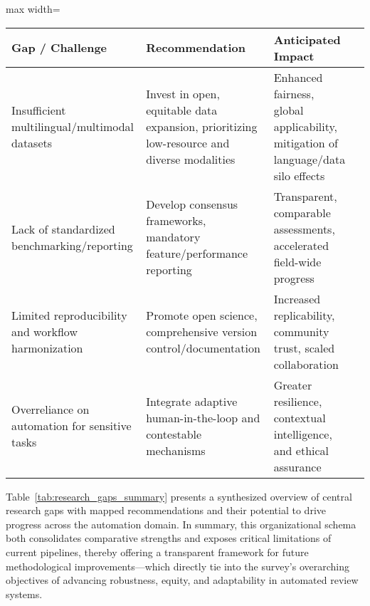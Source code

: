 \documentclass[sigconf]{acmart}
\begin{document}
\begin{table*}[htbp]
\centering
\caption{Summary of key research gaps, recommended actions, and projected impacts on the future of automated survey, review, and monitoring systems.}
\label{tab:research_gaps_summary}
\begin{adjustbox}{max width=\textwidth}
\begin{tabular}{@{}llll@{}}
\toprule
Gap / Challenge & Recommendation & Anticipated Impact &  \\ 
\midrule
Insufficient multilingual/multimodal datasets & Invest in open, equitable data expansion, prioritizing low-resource and diverse modalities & Enhanced fairness, global applicability, mitigation of language/data silo effects &  \\
Lack of standardized benchmarking/reporting     & Develop consensus frameworks, mandatory feature/performance reporting     & Transparent, comparable assessments, accelerated field-wide progress &  \\
Limited reproducibility and workflow harmonization   & Promote open science, comprehensive version control/documentation & Increased replicability, community trust, scaled collaboration &  \\
Overreliance on automation for sensitive tasks & Integrate adaptive human-in-the-loop and contestable mechanisms & Greater resilience, contextual intelligence, and ethical assurance    &  \\
\bottomrule
\end{tabular}
\end{adjustbox}
\end{table*}

Table~\ref{tab:research_gaps_summary} presents a synthesized overview of central research gaps with mapped recommendations and their potential to drive progress across the automation domain. In summary, this organizational schema both consolidates comparative strengths and exposes critical limitations of current pipelines, thereby offering a transparent framework for future methodological improvements—which directly tie into the survey’s overarching objectives of advancing robustness, equity, and adaptability in automated review systems.



\end{document}
